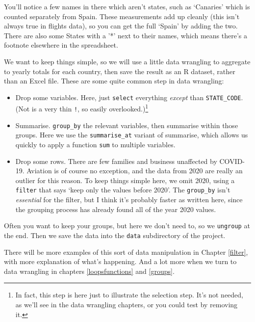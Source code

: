 \documentclass[
]{book}
\providecommand{\tightlist}{%
  \setlength{\itemsep}{0pt}\setlength{\parskip}{0pt}}
\begin{document}
You'll notice a few names in there which aren't states, such as `Canaries' which is counted separately from Spain. These measurements add up cleanly (this isn't always true in flights data), so you can get the full `Spain' by adding the two. There are also some States with a '*' next to their names, which means there's a footnote elsewhere in the spreadsheet.

We want to keep things simple, so we will use a little data wrangling to aggregate to yearly totals for each country, then save the result as an R dataset, rather than an Excel file. These are some quite common step in data wrangling:

\begin{itemize}
\tightlist
\item
  Drop some variables. Here, just \texttt{select} everything \emph{except} than \texttt{STATE\_CODE}. (Not is a very thin \texttt{!}, so easily overlooked.)\footnote{In fact, this step is here just to illustrate the selection step. It's not needed, as we'll see in the data wrangling chapters, or you could test by removing it.}
\item
  Summarise. \texttt{group\_by} the relevant variables, then summarise within those groups. Here we use the \texttt{summarise\_at} variant of summarise, which allows us quickly to apply a function \texttt{sum} to multiple variables.
\item
  Drop some rows. There are few families and business unaffected by COVID-19. Aviation is of course no exception, and the data from 2020 are really an outlier for this reason. To keep things simple here, we omit 2020, using a \texttt{filter} that says `keep only the values before 2020'. The \texttt{group\_by} isn't \emph{essential} for the filter, but I think it's probably faster as written here, since the grouping process has already found all of the year 2020 values.
\end{itemize}

Often you want to keep your groups, but here we don't need to, so we \texttt{ungroup} at the end. Then we save the data into the \texttt{data} subdirectory of the project.

There will be more examples of this sort of data manipulation in Chapter \ref{filter}, with more explanation of what's happening. And a lot more when we turn to data wrangling in chapters \ref{loopsfunctions} and \ref{groups}.
\end{document}
